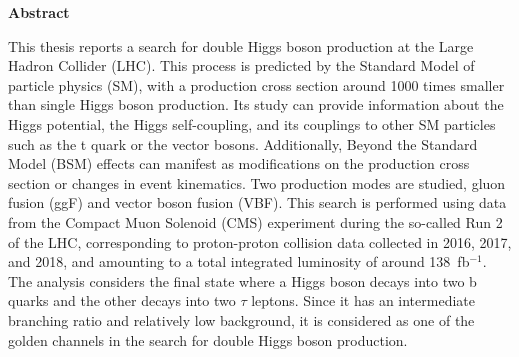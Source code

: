 \documentclass[../main.tex]{subfiles}
\begin{document}
\thispagestyle{plain}
\begin{center}
\textbf{Abstract}
\end{center}

This thesis reports a search for double Higgs boson production at the Large Hadron Collider (LHC). This process is predicted by the Standard Model of particle physics (SM), with a production cross section around 1000 times smaller than single Higgs boson production. Its study can provide information about the Higgs potential, the Higgs self-coupling, and its couplings to other SM particles such as the t quark or the vector bosons. Additionally, Beyond the Standard Model (BSM) effects can manifest as modifications on the production cross section or changes in event kinematics. Two production modes are studied, gluon fusion (ggF) and vector boson fusion (VBF). This search is performed using data from the Compact Muon Solenoid (CMS) experiment during the so-called Run 2 of the LHC, corresponding to proton-proton collision data collected in 2016, 2017, and 2018, and amounting to a total integrated luminosity of around 138~fb${}^{-1}$. The analysis considers the final state where a Higgs boson decays into two b quarks and the other decays into two $\tau$ leptons. Since it has an intermediate branching ratio and relatively low background, it is considered as one of the golden channels in the search for double Higgs boson production. 
\end{document}
